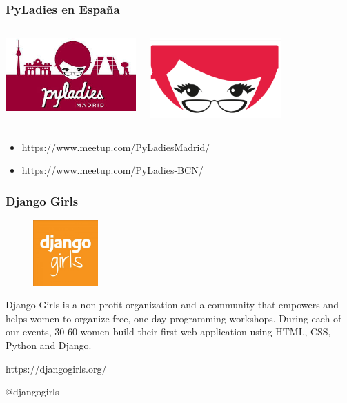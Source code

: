 \documentclass[18pt]{beamer}
\begin{document}
\begin{frame}

	\frametitle{PyLadies en España}
		
	\begin{columns}
		\centering
			\includegraphics[width=5cm]{images/pyladies_madrid.jpeg}\\
			\vspace{1cm}
			
		\centering
			\includegraphics[width=5cm]{images/pyladies_barcelona.png}
			\vspace{1cm}		
	\end{columns}
	
	\begin{itemize}	
		\setlength\itemsep{0.6em}
		\item https://www.meetup.com/PyLadiesMadrid/ 	
		\item https://www.meetup.com/PyLadies-BCN/ 
	\end{itemize}
	
\end{frame}


\begin{frame}

	\frametitle{Django Girls}
	
	\begin{figure}
		\includegraphics[width=2.5cm]{images/django_girls.jpg}
	\end{figure}
	
	Django Girls is a non-profit organization and a community that empowers and helps 
	women to organize free, one-day programming workshops. During each of our events, 
	30-60 women build their first web application using HTML, CSS, Python and Django. 
	

	\vspace{0.6cm}    
	\centerline{https://djangogirls.org/}
	
	\vspace{0.4cm}
	\centerline{@djangogirls}
	
\end{frame}
\end{document}
